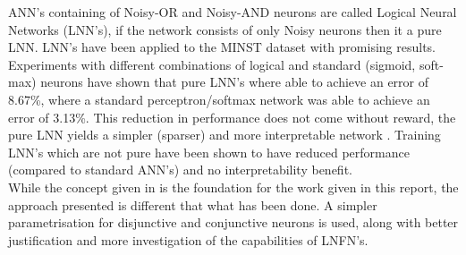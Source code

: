 ANN's containing of Noisy-OR and Noisy-AND neurons are called Logical Neural Networks (LNN's), if the network consists of only Noisy neurons then it a pure LNN. LNN's have been applied to the MINST dataset with promising results. Experiments with different combinations of logical and standard (sigmoid, soft-max) neurons have shown that pure LNN's where able to achieve an error of 8.67\%, where a standard perceptron/softmax network was able to achieve an error of 3.13\%. This reduction in performance does not come without reward, the pure LNN yields a simpler (sparser) and more interpretable network \cite{LearningLogicalActivations}. Training LNN's which are not pure have been shown to have reduced performance (compared to standard ANN's) and no interpretability benefit.\\


While the concept given in \cite{herrmann1996backpropagation} is the foundation for the work given in this report, the approach presented is different that what has been done. A simpler parametrisation for disjunctive and conjunctive neurons is used, along with better justification and more investigation of the capabilities of LNFN's.